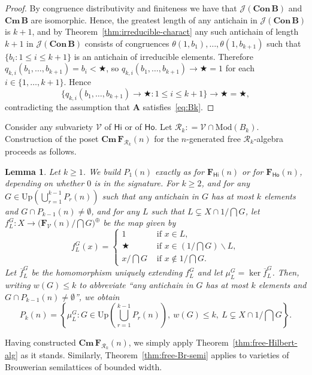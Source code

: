 \documentclass{amsart}
\newtheorem{lemma}[theorem]{Lemma}
\newcommand{\deq}{\mathrel{\mathop:}=}
\newcommand{\alg}[1]{\mathbf{#1}}
\newcommand{\var}[1]{\mathsf{#1}}
\newcommand{\ov}[1]{\overline{#1}}
\newcommand{\FV}{\alg{F}_\mathcal{V}}
\newcommand{\Con}[1]{\mathbf{Con}\, #1}
\newcommand{\Cm}[1]{\mathbf{Cm}\, #1}
\newcommand{\J}[1]{\mathcal{J}(#1)}
\def\ra{\rightarrow}
\def\op{\bigstar}
\begin{document}
\begin{proof}
By congruence distributivity and finiteness we have that
$\J{\Con{\alg{B}}}$ and $\Cm{\alg{B}}$ are isomorphic.
Hence, the greatest length of any antichain in $\J{\Con{\alg{B}}}$ is 
$k+1$, and by Theorem~\ref{thm:irreducible-charact} any such antichain of length
$k+1$ in $\J{\Con{\alg{B}}}$ consists of congruences 
$\theta(1,b_1),\dots,\theta(1,b_{k+1})$ such that 
$\{b_i: 1\leq i\leq k+1\}$ is an antichain of irreducible elements. Therefore
$q_{k,i}(b_1,\dots,b_{k+1}) = b_i<\op$, so 
$q_{k,i}(b_1,\dots,b_{k+1})\ra \op = 1$ for each $i\in\{1,\dots,k+1\}$. Hence
$$
\{q_{k,i}(b_1,\dots,b_{k+1})\ra \op:1\leq i\leq k+1\}\ra \op = \op,
$$
contradicting the assumption that $\alg{A}$ satisfies~\eqref{eq:Bk}.
\end{proof}  


Consider any subvariety $\mathcal{V}$ of $\var{Hi}$ or
of $\var{Ho}$. 
Let $\mathcal{R}_k\deq \mathcal{V}\cap \mathrm{Mod}(B_k)$. 
Construction of the poset $\Cm{\alg{F}_{\mathcal{R}_k}(n)}$ for the $n$-generated free
$\mathcal{R}_k$-algebra proceeds as follows.

\begin{lemma}\label{lem:bounded-width}
Let $k\geq 1$. We build $P_1(n)$ exactly as for $\alg{F}_{\var{Hi}}(n)$
or for $\alg{F}_{\var{Ho}}(n)$, depending on whether\/ $0$ is in the signature.   
For $k\geq 2$, and for any $G\in \mathrm{Up}\left(\bigcup_{r=1}^{k-1}P_r(n)\right)$
such that any antichain in $G$ has at most $k$ elements and
$G\cap P_{k-1}(n)\neq \emptyset$, and for any $L$ such that
$L\subsetneq X\cap 1/\bigcap G$, 
let $f^G_L\colon X \to  \bigl(\FV(n)/\bigcap G\bigr)^\oplus$ be the map
given by 
$$
f^G_L(x) =\begin{cases}
  1 & \text{ if } x\in L,\\
  \op & \text{ if } x\in \left(1/\bigcap G\right)\smallsetminus L,\\
  x/\bigcap G & \text{ if } x\notin 1/\bigcap G.
\end{cases} 
$$
Let $\ov{f}^G_L$ be the homomorphism uniquely extending $f^G_L$ and
let $\mu^G_L = \ker\ov{f}^G_L$. Then, writing
$w(G)\leq k$ to abbreviate ``any antichain in $G$ has at most $k$ elements and
$G\cap P_{k-1}(n)\neq \emptyset$'', we obtain
$$
P_k(n) =
\left\{\mu^G_L: G\in \mathrm{Up}\left(\bigcup_{r=1}^{k-1}P_r(n)\right),\ 
w(G)\leq k,\ L\subsetneq X\cap 1/\bigcap G  
\right\}.
$$
\end{lemma}  

Having constructed $\Cm{\alg{F}_{\mathcal{R}_k}(n)}$, we simply
apply Theorem~\ref{thm:free-Hilbert-alg} as it stands. Similarly,
Theorem~\ref{thm:free-Br-semi} applies to varieties of Brouwerian semilattices
of bounded width. 
\end{document}
